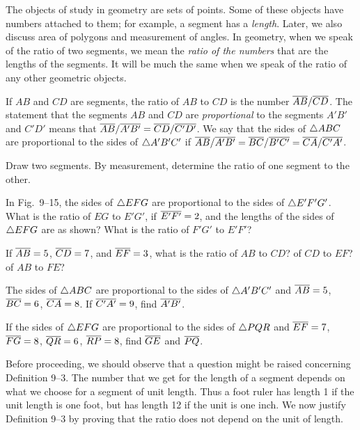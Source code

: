 \documentclass[11pt]{book}
\begin{document}
The objects of study in geometry are sets of points. Some of these objects have
numbers attached to them; for example, a segment has a \emph{length}. Later, we
also discuss area of polygons and measurement of angles. In geometry, when we
speak of the ratio of two segments, we mean the \emph{ratio of the numbers} that
are the lengths of the segments. It will be much the same when we speak of the
ratio of any other geometric objects.

\begin{definition}
If $AB$ and $CD$ are segments, the ratio of $AB$ to $CD$ is the number
$\overline{AB}/\overline{CD}$. The statement that the segments $AB$ and $CD$ are
\emph{proportional} to the segments $A'B'$ and $C'D'$ means that
$\overline{AB}/\overline{A'B'} = \overline{CD}/\overline{C'D'}$. We say that the sides of $\triangle ABC$ are
proportional to the sides of $\triangle A'B'C'$ if $\overline{AB}/\overline{A'B'} =
\overline{BC}/\overline{B'C'} = \overline{CA}/\overline{C'A'}$.
\end{definition}

\begin{exercisecols}
\begin{exlist}
\item Draw two segments. By measurement, determine the ratio of one segment to
      the other.
\item In Fig.~9--15, the sides of $\triangle EFG$ are proportional to the sides of
      $\triangle E'F'G'$. What is the ratio of $EG$ to $E'G'$, if $\overline{E'F'} = 2$,
      and the lengths of the sides of $\triangle EFG$ are as shown? What is the ratio
      of $F'G'$ to $E'F'$?
\exfig{\FIGIXFIFTEEN}
\item If $\overline{AB} = 5$, $\overline{CD} = 7$, and $\overline{EF} = 3$, what is the ratio of
      $AB$ to $CD$? of $CD$ to $EF$? of $AB$ to $FE$?
\item The sides of $\triangle ABC$ are proportional to the sides of $\triangle A'B'C'$
      and $\overline{AB} = 5$, $\overline{BC} = 6$, $\overline{CA} = 8$. If $\overline{C'A'} = 9$, find
      $\overline{A'B'}$.
\item If the sides of $\triangle EFG$ are proportional to the sides of $\triangle PQR$
      and $\overline{EF} = 7$, $\overline{FG} = 8$, $\overline{QR} = 6$, $\overline{RP} = 8$, find
      $\overline{GE}$ and $\overline{PQ}$.
\end{exlist}
\end{exercisecols}

Before proceeding, we should observe that a question might be raised concerning
Definition 9--3. The number that we get for the length of a segment depends on
what we choose for a segment of unit length. Thus a foot ruler has length 1 if
the unit length is one foot, but has length 12 if the unit is one inch. We now
justify Definition 9--3 by proving that the ratio does not depend on the unit of
length.
\end{document}
